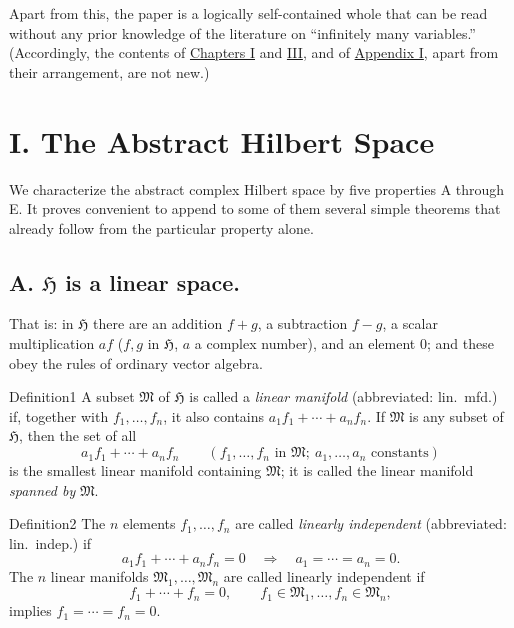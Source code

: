 ﻿\documentclass[paper=b5,fontsize=13pt,bookmarkpackage=false,twoside]{scrartcl}
\begin{document}
Apart from this, the paper is a logically self-contained whole that can be read without any prior knowledge of the literature on ``infinitely many variables.'' (Accordingly, the contents of \hyperref[chap:I]{Chapters I} and \hyperref[chap:III]{III}, and of \hyperref[app:I]{Appendix I}, apart from their arrangement, are not new.)

\section*{I. The Abstract Hilbert Space}\label{chap:I}

We characterize the abstract complex Hilbert space by five properties A through E. It proves convenient to append to some of them several simple theorems that already follow from the particular property alone.

\subsection*{A. $\mathfrak H$ is a linear space.}\label{axiom:A}

That is: in $\mathfrak H$ there are an addition $f+g$, a subtraction $f-g$, a scalar multiplication $af$ ($f,g$ in $\mathfrak H$, $a$ a complex number), and an element $0$; and these obey the rules of ordinary vector algebra.

\begin{namedstatement}{Definition}{1}\label{def:1}
A subset $\mathfrak M$ of $\mathfrak H$ is called a \emph{linear manifold} (abbreviated: lin.\ mfd.) if, together with $f_1,\ldots,f_n$, it also contains $a_1f_1+\cdots+a_nf_n$. If $\mathfrak M$ is any subset of $\mathfrak H$, then the set of all
\[
 a_1f_1+\cdots+a_nf_n
 \qquad
 (f_1,\ldots,f_n\text{ in }\mathfrak M;\ a_1,\ldots,a_n\text{ constants})
\]
is the smallest linear manifold containing $\mathfrak M$; it is called the linear manifold \emph{spanned by} $\mathfrak M$.
\end{namedstatement}

\begin{namedstatement}{Definition}{2}\label{def:2}
The $n$ elements $f_1,\ldots,f_n$ are called \emph{linearly independent} (abbreviated: lin.\ indep.) if
\[
 a_1f_1+\cdots+a_nf_n=0
 \quad\Longrightarrow\quad
 a_1=\cdots=a_n=0.
\]
The $n$ linear manifolds $\mathfrak M_1,\ldots,\mathfrak M_n$ are called linearly independent if
\[
 f_1+\cdots+f_n=0,
 \qquad
 f_1\in\mathfrak M_1,\ldots,f_n\in\mathfrak M_n,
\]
implies $f_1=\cdots=f_n=0$.
\end{namedstatement}
\end{document}
